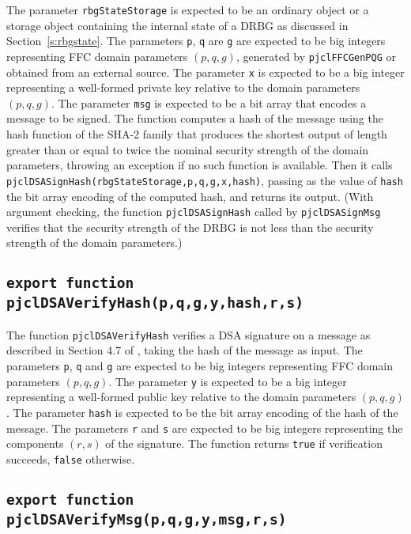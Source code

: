 \documentclass[12pt]{article}
\begin{document}
The parameter {\tt rbgStateStorage} is expected to be an ordinary
object or a storage object containing the internal state of a DRBG 
as discussed in Section~\ref{s:rbgstate}.
The parameters {\tt p}, {\tt q} are {\tt g}
are expected to be big integers representing FFC domain parameters $(p,q,g)$,
generated by {\tt pjclFFCGenPQG} or obtained from an external source.
The parameter {\tt x} is expected to be a big integer representing a well-formed private key
relative to the domain parameters $(p,q,g)$.
The parameter {\tt msg} is expected to be a bit array that encodes a message
to be signed.  The function computes a hash of the message using 
the hash function of the SHA-2 family
that produces the shortest output of length greater than or equal to 
twice the nominal security strength of the domain
parameters, throwing an exception if no such function is available.  Then it calls
{\tt pjclDSASignHash(rbgStateStorage,p,q,g,x,hash)}, passing as the value of {\tt hash}
the bit array encoding of the computed hash, and returns its output.
(With argument checking, the function {\tt pjclDSASignHash} called by
{\tt pjclDSASignMsg} verifies that the security strength of the DRBG
is not less than the security strength of the domain parameters.)

\subsection{\tt export function pjclDSAVerifyHash(p,q,g,y,hash,r,s)}

The function {\tt pjclDSAVerifyHash} verifies a DSA signature on a message as described in
Section 4.7 of \cite{DSS-4}, taking the hash of the message as input.
The parameters {\tt p}, {\tt q} and {\tt g} are expected to be big integers 
representing FFC domain parameters $(p,q,g)$.
The parameter {\tt y} is expected to be a big integer
representing a well-formed public key relative to the domain parameters $(p,q,g)$.
The parameter {\tt hash} is expected to be the bit array encoding of the
hash of the message.
The parameters {\tt r} and {\tt s} are expected to be big integers
representing the components $(r,s)$ of the signature.
The function returns
{\tt true} if verification succeeds, {\tt false} otherwise.

\subsection{\tt export function pjclDSAVerifyMsg(p,q,g,y,msg,r,s)}
\end{document}
